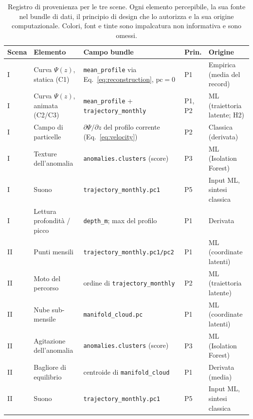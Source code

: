 \begin{table}[tbp]
\centering
\caption[Registro di provenienza]{Registro di provenienza per le tre scene. Ogni
elemento percepibile, la sua fonte nel bundle di dati, il principio di design che
lo autorizza e la sua origine computazionale. Colori, font e tinte sono
impalcatura non informativa e sono omessi.}
\label{tab:ledger}
\footnotesize
\renewcommand{\arraystretch}{1.3}
\begin{tabularx}{\textwidth}{@{}p{1.2cm} X p{3.4cm} p{1.1cm} X@{}}
\toprule
\textbf{Scena} & \textbf{Elemento} & \textbf{Campo bundle} & \textbf{Prin.} &
\textbf{Origine} \\
\midrule
I   & Curva $\Psi(z)$, statica (C1) & \texttt{mean\_profile} via Eq.~\ref{eq:reconstruction}, $\mathrm{pc}=0$ & P1 & Empirica (media del record) \\
I   & Curva $\Psi(z)$, animata (C2/C3) & \texttt{mean\_profile} + \texttt{trajectory\_monthly} & P1, P2 & ML (traiettoria latente; H2) \\
I   & Campo di particelle & $\partial\Psi/\partial z$ del profilo corrente (Eq.~\ref{eq:velocity}) & P2 & Classica (derivata) \\
I   & Texture dell'anomalia & \texttt{anomalies.clusters} (score) & P3 & ML (Isolation Forest) \\
I   & Suono & \texttt{trajectory\_monthly.pc1} & P5 & Input ML, sintesi classica \\
I   & Lettura profondità / picco & \texttt{depth\_m}; max del profilo & P1 & Derivata \\
\addlinespace
II  & Punti mensili & \texttt{trajectory\_monthly.pc1/pc2} & P1 & ML (coordinate latenti) \\
II  & Moto del percorso & ordine di \texttt{trajectory\_monthly} & P2 & ML (traiettoria latente) \\
II  & Nube sub-mensile & \texttt{manifold\_cloud.pc} & P1 & ML (coordinate latenti) \\
II  & Agitazione dell'anomalia & \texttt{anomalies.clusters} (score) & P3 & ML (Isolation Forest) \\
II  & Bagliore di equilibrio & centroide di \texttt{manifold\_cloud} & P1 & Derivata (media) \\
II  & Suono & \texttt{trajectory\_monthly.pc1} & P5 & Input ML, sintesi classica \\

\end{tabularx}
\end{table}

